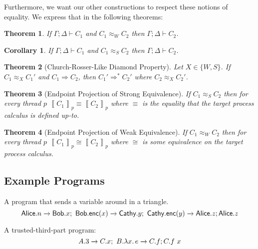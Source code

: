 \documentclass{article}
\newtheorem{thm}{Theorem}
\newtheorem{cor}{Corollary}
\theoremstyle{definition}
\newcommand{\To}{\Rightarrow}
\newcommand{\ceq}{\approx}
\newcommand{\own}[2]{#1.#2}
\newcommand{\send}[3][]{#2\nolinebreak \mathrel{\xrightarrow{#1}}\nolinebreak #3}
\newcommand{\proves}{\vdash}
\newcommand{\transb}[1]{\left\llbracket #1 \right\rrbracket}
\begin{document}
Furthermore, we want our other constructions to respect these notions of equality.
We express that in the following theorems:
\begin{thm}
  If $\Gamma; \Delta \proves C_1$ and $C_1 \ceq_W C_2$ then $\Gamma; \Delta \proves C_2$.
\end{thm}
\begin{cor}
  If $\Gamma; \Delta \proves C_1$ and $C_1 \ceq_S C_2$ then $\Gamma; \Delta \proves C_2$.
\end{cor}

\begin{thm}[Church-Rosser-Like Diamond Property]
  Let $X \in \{W,S\}$.
  If $C_1 \ceq_X C_1'$ and $C_1 \To C_2$, then $C_1' \To^\ast C_2'$ where $C_2 \ceq_X C_2'$.
\end{thm}

\begin{thm}[Endpoint Projection of Strong Equivalence]
  If $C_1 \ceq_S C_2$ then for every thread $p$ $\transb{C_1}_p \equiv \transb{C_2}_p$ where $\equiv$ is the equality that the target process calculus is defined up-to.
\end{thm}
\begin{thm}[Endpoint Projection of Weak Equivalence]
  If $C_1 \ceq_W C_2$ then for every thread $p$ $\transb{C_1}_p \cong \transb{C_2}_p$ where $\cong$ is some equivalence on the target process calculus.
\end{thm}
\fi



\subsection{Example Programs}
A program that sends a variable around in a triangle.
$$\send{\own{\textsf{Alice}}{n}}{\own{\textsf{Bob}}{x}};~\send{\own{\textsf{Bob}}{\textsf{enc}(x)}}{\own{\textsf{Cathy}}{y}};~\send{\own{\textsf{Cathy}}{\textsf{enc}(y)}}{\own{\textsf{Alice}}{z}}; \own{\textsf{Alice}}{z}$$

A trusted-third-part program:
$$\send{\own{A}{3}}{\own{C}{x}};~\send{\own{B}{\lambda x.\,e}}{\own{C}{f}}; \own{C}{f~x}$$


\end{document}

